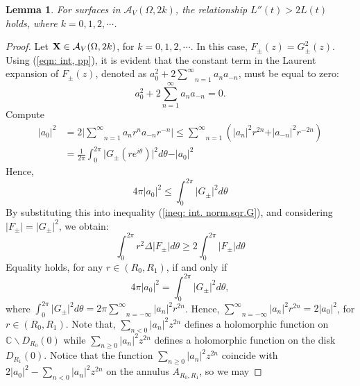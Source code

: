 \documentclass[11pt]{amsart}
\newtheorem{lem}[thm]{Lemma}
\numberwithin{equation}{section}
\theoremstyle{theorem}
\theoremstyle{definition}
\numberwithin{equation}{section}
\begin{document}
\begin{lem} \label{lem: L''(t)>2L(t)}
     For surfaces in $\mathcal{A}_V(\Omega ,2k)$, the relationship  $L''(t) > 2L(t)$ holds, where $k=0,1,2,\cdots  $.
\end{lem}
\begin{proof}
   Let $\bold{X} \in \mathcal{A}_V(\Omega, 2k)$, for $k=0,1,2,\cdots$. In this case, $F_{\pm}(z)=G_{\pm}^2(z)$. Using (\ref{eqn: int, pp}), it is evident that the constant term in the Laurent expansion of $F_{\pm}(z)$, denoted as  $a_0^2 + 2\underset{n=1 }{\overset{\infty}{\sum}} a_n a_{-n}$, must be equal to zero:
\begin{equation}
    \nonumber
    a_0^2 + 2 \underset{n=1 }{\overset{\infty}{\sum}} a_n a_{-n} =0.
\end{equation}
Compute
\begin{equation}
    \nonumber
    \begin{split}
    \vert a_0 \vert^2 & = 2 \Big\vert \underset{n=1 }{\overset{\infty}{\sum}} a_n r^n a_{-n} r^{-n} \Big\vert \leq \underset{n=1 }{\overset{\infty}{\sum}} (\vert a_n \vert^2 r^{2n} + \vert a_{-n} \vert^2 r^{-2n} ) \\
    & = \frac{1}{2\pi} \int_{0}^{2\pi} \vert G_{\pm}(re^{i\theta} ) \vert^2 d\theta - \vert a_0\vert^2
    \end{split}
\end{equation}
Hence,
\begin{equation} \label{ineq: a_0&int.norm.sqrG}
    4\pi \vert a_0\vert^2 \leq \int_{0}^{2\pi} \vert G_{\pm}\vert^2 d\theta 
\end{equation}
By substituting this into inequality (\ref{ineq: int. norm.sqr.G}), and considering $\vert F_{\pm}\vert =\vert G_{\pm}\vert^2$, we obtain:
\begin{equation}  \label{ineq: intg. norm F}
\int_{0}^{2\pi} r^2 \Delta \vert F_{\pm}\vert d\theta \geq 2\int_{0}^{2\pi} \vert F_{\pm}\vert d\theta  
\end{equation}
Equality holds, for any $r\in (R_0,R_1)$, if and only if  
$$
 4\pi \vert a_0\vert^2 = \int_{0}^{2\pi} \vert G_{\pm}\vert^2 d\theta ,
$$
where $\int_{0}^{2\pi} \vert G_{\pm}\vert^2 d\theta = 2\pi \underset{n=-\infty }{\overset{\infty}{\sum}} \vert a_n \vert^2 r^{2n}$. Hence, $\underset{n=-\infty }{\overset{\infty}{\sum}} \vert a_n \vert^2 r^{2n}= 2 \vert a_0\vert^2$, for $r\in (R_0,R_1)$. Note that, $\underset{n<0}{\sum} \vert a_n \vert^2 z^{2n}$ defines a holomorphic function on $\mathbb{C}\backslash D_{R_0}(0)$ while $\underset{n\geq 0 }{\sum} \vert a_n \vert^2 z^{2n}$ defines a holomorphic function on the disk $D_{R_1}(0)$. Notice that the function $\underset{n\geq 0 }{\sum} \vert a_n \vert^2 z^{2n}$ coincide with $2 \vert a_0\vert^2 -\underset{n<0}{\sum} \vert a_n \vert^2 z^{2n}$ on the annulus $A_{R_0,R_1}$, so we may 

\end{proof}
\end{document}
